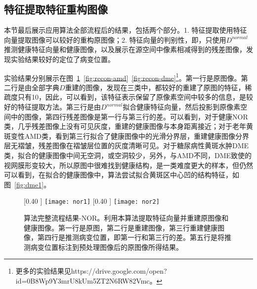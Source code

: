 
    \subsection{特征提取特征重构图像}
    本节最后展示应用算法全部流程后的结果，包括两个部分。1. 特征提取使用特征向量提取图像可以较好的重构原图像；2. 特征向量的判别性，即，只使用$D^{normal}$推测健康特征向量和健康图像，以及展示在源空间中像素相减得到的残差图像，发现实验结果较好的定位了病变位置。

    实验结果分别展示在图~\ref{fig:recon-nor}~\ref{fig:recon-amd}~\ref{fig:recon-dme}\footnote{更多的实验结果见https://drive.google.com/open?id=0B8Wp9Y3mrU8kUm5ZT2N6RW82Vmc。}。第一行是原图像。第二行是由全部字典$D$重建的图像，发现在三类中，都较好的重建了原图的特征，稀疏度只有10，因此，可以看到，该特征表示保留了原像素空间中较多的信息，是较好的特征提取方法。第三行是由$D^{normal}$拟合健康特征向量，然后投影到原像素空间中的图像，第四行残差图像是第一行与第三行的差。可以看到，对于健康NOR类，几乎残差图像上没有可见灰度，重建的健康图像与本身距离接近；对于老年黄斑变性AMD类，看到第三行拟合了健康图像中的光滑分界层，重建健康图像分界层无褶皱，残差图像在褶皱层位置的灰度清晰可见。对于糖尿病性黄斑水肿DME类，拟合的健康图像中间无空洞，或空洞较少，另外，与AMD不同，DME致使的视网膜形变较大，所以原图中很难找到健康结构，是一类难度更大的样本，但仍然可以看到，在拟合的健康图像中，算法尝试拟合黄斑区中心凹的结构特征，如图~\ref{fig:dme1}。

    \begin{figure}[htb]
      \centering%
      [0.40 \textwidth] %
        {\texttt{[image: nor1]}} %
      [0.40 \textwidth] %
        {\texttt{[image: nor2]}} \\
      \caption[算法完整流程结果-NOR]{算法完整流程结果-NOR。利用本算法提取特征向量并重建原图像和健康图像。第一行是原图，第二行是重建图像，第三行重建健康图像，第四行是推测病变位置，即第一行和第三行的差。第五行是将推测病变位置标注到预处理图像后的原图像所得结果。}
      \label{fig:recon-nor}
    \end{figure}

